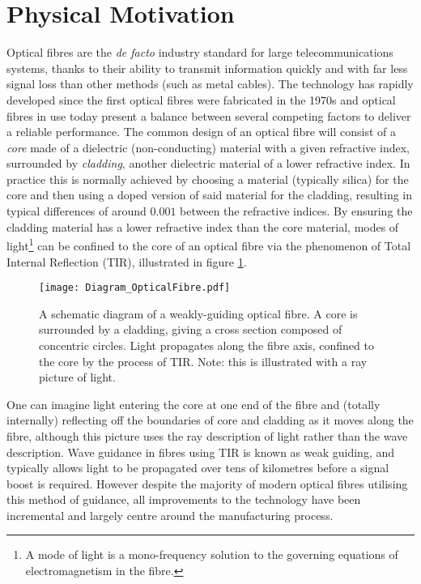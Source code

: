 \section{Physical Motivation} \label{sec:PhysMot}
Optical fibres are the \textit{de facto} industry standard for large telecommunications systems, thanks to their ability to transmit information quickly and with far less signal loss than other methods (such as metal cables).
The technology has rapidly developed since the first optical fibres were fabricated in the 1970s \cite{knight2003photonic} and optical fibres in use today present a balance between several competing factors to deliver a reliable performance.
The common design of an optical fibre will consist of a \emph{core} made of a dielectric (non-conducting) material with a given refractive index, surrounded by \emph{cladding}, another dielectric material of a lower refractive index.
In practice this is normally achieved by choosing a material (typically silica) for the core and then using a doped version of said material for the cladding, resulting in typical differences of around $0.001$ between the refractive indices.
By ensuring the cladding material has a lower refractive index than the core material, modes of light\footnote{A mode of light is a mono-frequency solution to the governing equations of electromagnetism in the fibre.} can be confined to the core of an optical fibre via the phenomenon of Total Internal Reflection (TIR), illustrated in figure \ref{fig:Diagram_OpticalFibre}.
\begin{figure}[h]
	\centering
	\texttt{[image: Diagram\_OpticalFibre.pdf]}
	\caption[Illustration of a weakly-guiding optical fibre.]{\label{fig:Diagram_OpticalFibre} A schematic diagram of a weakly-guiding optical fibre. A core is surrounded by a cladding, giving a cross section composed of concentric circles. Light propagates along the fibre axis, confined to the core by the process of TIR. Note: this is illustrated with a ray picture of light.}
\end{figure} 
One can imagine light entering the core at one end of the fibre and (totally internally) reflecting off the boundaries of core and cladding as it moves along the fibre, although this picture uses the ray description of light rather than the wave description.
Wave guidance in fibres using TIR is known as weak guiding, and typically allows light to be propagated over tens of kilometres before a signal boost is required.
However despite the majority of modern optical fibres utilising this method of guidance, all improvements to the technology have been incremental and largely centre around the manufacturing process.

